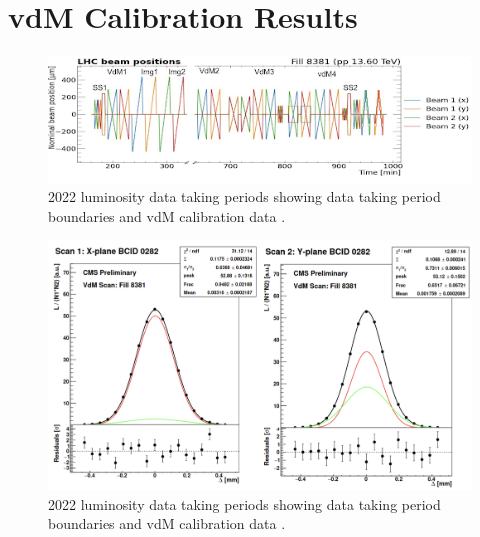 \section{vdM Calibration Results}

\begin{figure}[!htp]
\centering
\includegraphics[width=1\textwidth]{ashish_thesis/2022_vdM.png}
\caption[2018 CMS luminosity data taking periods.]{%
  2022 luminosity data taking periods showing data taking period boundaries and vdM calibration data  \cite{CERNLumiPublicResults}.
}
\label{fig:period_bound}
\end{figure}






\begin{figure}[!htp]
\centering
\includegraphics[width=1\textwidth]{ashish_thesis/2022_vdM_fit.png}
\caption[2018 CMS luminosity data taking periods.]{%
  2022 luminosity data taking periods showing data taking period boundaries and vdM calibration data  \cite{CERNLumiPublicResults}.
}
\label{fig:period_bound}
\end{figure}



